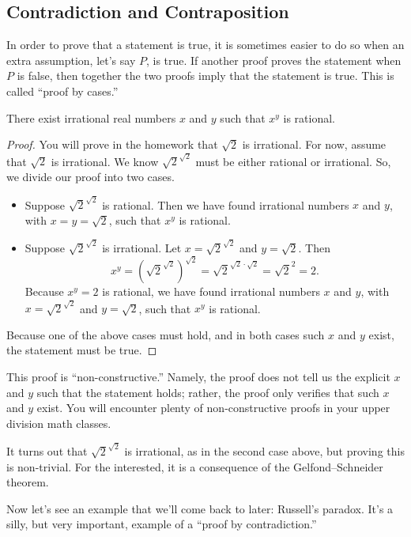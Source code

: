 \documentclass[../main.tex]{subfiles}
\begin{document}
\subsection{Contradiction and Contraposition}
In order to prove that a statement is true, it is sometimes easier to do so when an extra assumption, let's say $P$, is true. If another proof proves the statement when $P$ is false, then together the two proofs imply that the statement is true. This is called ``proof by cases.''
\begin{example}
    There exist irrational real numbers $x$ and $y$ such that $x^y$ is rational.
\end{example}
\begin{proof}
    You will prove in the homework that $\sqrt{2}$ is irrational. For now, assume that $\sqrt{2}$ is irrational. We know $\sqrt{2}^{\sqrt{2}}$ must be either rational or irrational. So, we divide our proof into two cases.
    \begin{itemize}
        \item Suppose $\sqrt{2}^{\sqrt{2}}$ is rational. Then we have found irrational numbers $x$ and $y$, with $x = y = \sqrt{2}$, such that $x^y$ is rational.
        \item Suppose $\sqrt{2}^{\sqrt{2}}$ is irrational. Let $x = \sqrt{2}^{\sqrt{2}}$ and $y = \sqrt{2}$. Then
        \[x^y = \left(\sqrt{2}^{\sqrt{2}}\right)^{\sqrt{2}} = \sqrt{2}^{\sqrt{2} \cdot \sqrt{2}} = \sqrt{2}^2 = 2.\]
        Because $x^y=2$ is rational, we have found irrational numbers $x$ and $y$, with $x = \sqrt{2}^{\sqrt{2}}$ and $y = \sqrt{2}$, such that $x^y$ is rational. 
    \end{itemize}
    Because one of the above cases must hold, and in both cases such $x$ and $y$ exist, the statement must be true.
\end{proof}
This proof is ``non-constructive.'' Namely, the proof does not tell us the explicit $x$ and $y$ such that the statement holds; rather, the proof only verifies that such $x$ and $y$ exist. You will encounter plenty of non-constructive proofs in your upper division math classes.
\begin{remark}
    It turns out that $\sqrt{2}^{\sqrt{2}}$ is irrational, as in the second case above, but proving this is non-trivial. For the interested, it is a consequence of the Gelfond--Schneider theorem.
\end{remark}
Now let's see an example that we'll come back to later: Russell's paradox. It's a silly, but very important, example of a ``proof by contradiction.''
\end{document}
